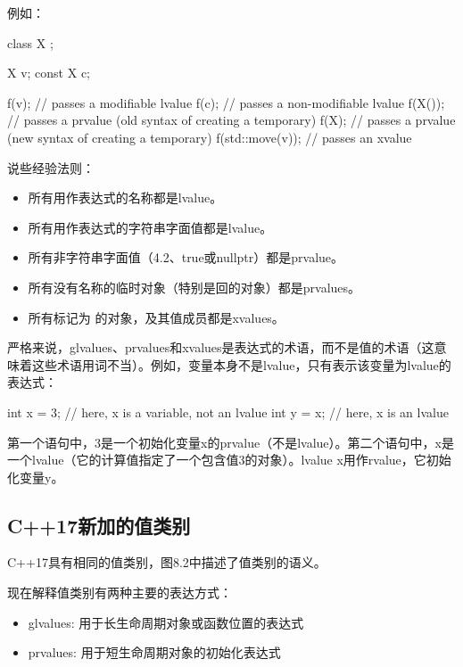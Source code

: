 例如：

\begin{cppcode}
class X {
};

X v;
const X c;

f(v); // passes a modifiable lvalue
f(c); // passes a non-modifiable lvalue
f(X()); // passes a prvalue (old syntax of creating a temporary)
f(X{}); // passes a prvalue (new syntax of creating a temporary)
f(std::move(v)); // passes an xvalue
\end{cppcode}

说些经验法则：

\begin{itemize}
	\item 所有用作表达式的名称都是lvalue。
	\item 所有用作表达式的字符串字面值都是lvalue。
	\item 所有非字符串字面值（4.2、true或nullptr）都是prvalue。
	\item 所有没有名称的临时对象（特别是回的对象）都是prvalues。
	\item 所有标记为  的对象，及其值成员都是xvalues。
\end{itemize}

严格来说，glvalues、prvalues和xvalues是表达式的术语，而不是值的术语（这意味着这些术语用词不当）。例如，变量本身不是lvalue，只有表示该变量为lvalue的表达式：

\begin{cppcode}
int x = 3; // here, x is a variable, not an lvalue
int y = x; // here, x is an lvalue
\end{cppcode}

第一个语句中，3是一个初始化变量x的prvalue（不是lvalue）。第二个语句中，x是一个lvalue（它的计算值指定了一个包含值3的对象）。lvalue x用作rvalue，它初始化变量y。

\subsection{C++17新加的值类别}

C++17具有相同的值类别，图8.2中描述了值类别的语义。

现在解释值类别有两种主要的表达方式：

\begin{itemize}
	\item glvalues: 用于长生命周期对象或函数位置的表达式
	\item prvalues: 用于短生命周期对象的初始化表达式
\end{itemize}

